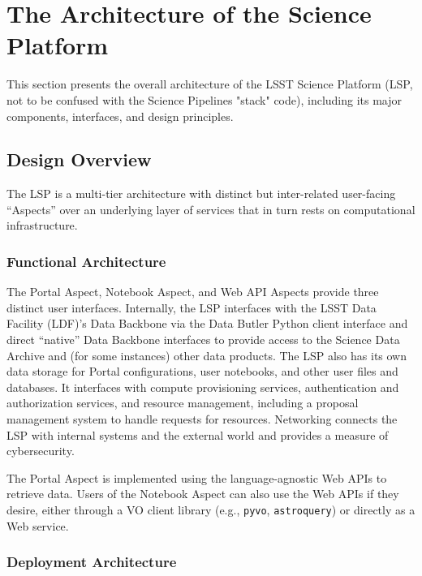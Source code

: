 \section{The Architecture of the Science Platform}\label{architecture}

This section presents the overall architecture of the LSST Science Platform
(LSP, not to be confused with the Science Pipelines "stack" code), including
its major components, interfaces, and design principles.

\subsection{Design Overview}\label{design-overview}

The LSP is a multi-tier architecture with distinct but inter-related
user-facing ``Aspects'' over an underlying layer of services that in turn
rests on computational infrastructure.

\subsubsection{Functional Architecture}\label{functional-architecture}

The Portal Aspect, Notebook Aspect, and Web API Aspects provide three
distinct user interfaces.
Internally, the LSP interfaces with the LSST Data Facility (LDF)'s Data
Backbone via the Data Butler Python client interface and direct 
``native'' Data Backbone
interfaces to provide access to the Science Data Archive and (for some
instances) other data products.
The LSP also has its own data storage for
Portal configurations, user notebooks, and other user files and databases.  
It interfaces with compute provisioning services, authentication and
authorization services, and resource management, including a proposal
management system to handle requests for resources.
Networking connects the LSP with internal
systems and the external world and provides a measure of cybersecurity.

The Portal Aspect is implemented using the language-agnostic Web APIs to
retrieve data.  
Users of the Notebook Aspect can also use the Web APIs if they
desire, either through a VO client library (e.g., \texttt{pyvo}, 
\texttt{astroquery}) or directly as a Web service.

\subsubsection{Deployment Architecture}\label{deployment-architecture}

